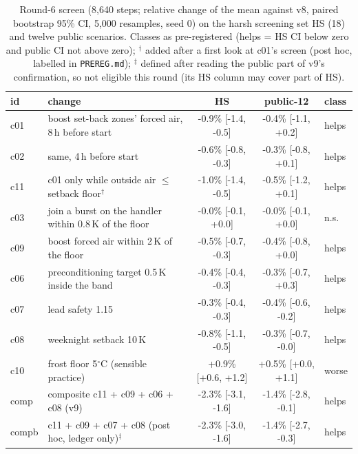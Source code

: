 \begin{table}[!htbp]
\caption{Round-6 screen (8,640 steps; relative change of the mean against v8, paired bootstrap 95\% CI, 5,000 resamples, seed 0) on the harsh screening set HS (18) and twelve public scenarios. Classes as pre-registered (helps = HS CI below zero and public CI not above zero); $^\dagger$ added after a first look at c01's screen (post hoc, labelled in \texttt{PREREG.md}); $^\ddagger$ defined after reading the public part of v9's confirmation, so not eligible this round (its HS column may cover part of HS).}
\label{tab:candidates_r6}
\centering\scriptsize
\begin{tabular}{llccl}
\toprule
id & change & HS & public-12 & class \\
\midrule
c01 & boost set-back zones' forced air, 8\,h before start & -0.9\% [-1.4, -0.5] & -0.4\% [-1.1, +0.2] & helps \\
c02 & same, 4\,h before start & -0.6\% [-0.8, -0.3] & -0.3\% [-0.8, +0.1] & helps \\
c11 & c01 only while outside air $\le$ setback floor$^\dagger$ & -1.0\% [-1.4, -0.5] & -0.5\% [-1.2, +0.1] & helps \\
c03 & join a burst on the handler within 0.8\,K of the floor & -0.0\% [-0.1, +0.0] & -0.0\% [-0.1, +0.0] & n.s. \\
c09 & boost forced air within 2\,K of the floor & -0.5\% [-0.7, -0.3] & -0.4\% [-0.8, +0.0] & helps \\
c06 & preconditioning target 0.5\,K inside the band & -0.4\% [-0.4, -0.3] & -0.3\% [-0.7, +0.3] & helps \\
c07 & lead safety 1.15 & -0.3\% [-0.4, -0.3] & -0.4\% [-0.6, -0.2] & helps \\
c08 & weeknight setback 10\,K & -0.8\% [-1.1, -0.5] & -0.3\% [-0.7, -0.0] & helps \\
c10 & frost floor 5$^\circ$C (sensible practice) & +0.9\% [+0.6, +1.2] & +0.5\% [+0.0, +1.1] & worse \\
comp & composite c11 + c09 + c06 + c08 (v9) & -2.3\% [-3.1, -1.6] & -1.4\% [-2.8, -0.1] & helps \\
compb & c11 + c09 + c07 + c08 (post hoc, ledger only)$^\ddagger$ & -2.3\% [-3.0, -1.6] & -1.4\% [-2.7, -0.3] & helps \\
\bottomrule
\end{tabular}
\end{table}

